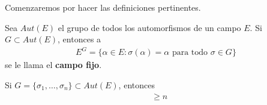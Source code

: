 Comenzaremos por hacer las definiciones pertinentes.\par\null

\begin{definicion}
    Sea $Aut(E)$ el grupo de todos los automorfismos de un campo $E$. Si $G \subset Aut(E)$, 
    entonces a
    \begin{align}
        E^G = \{  \alpha \in E : \sigma(\alpha) = \alpha \text{ para todo } \sigma \in G \}
    \end{align}
    se le llama el \textbf{campo fijo}.
\end{definicion}

\begin{lema}\label{Artin:lema}
    Si $G = \{ \sigma_1, \dots, \sigma_n \} \subset Aut(E)$, entonces
    \begin{align}
        [E:E^G]     &\geq   n
    \end{align}
\end{lema}\par\null

